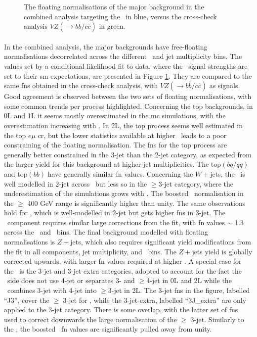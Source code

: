 \begin{figure}[h!]
    \caption{The floating normalisations of the major background in the combined analysis targeting the \vhbc\ in blue, versus the cross-check analysis $VZ(\rightarrow b\bar{b}/c\bar{c})$ in green.}
    \label{fig:FNback}
\end{figure} 

\paragraph{}In the combined analysis, the major backgrounds have free-floating normalisations decorrelated across the different \ptv\ and jet multiplicity bins. The values set by a conditional likelihood fit to data, where the \vhbc\ signal strengths are set to their \gls{sm} expectations, are presented in Figure \ref{fig:FNback}. They are compared to the same \glspl{fn} obtained in the cross-check analysis, with $VZ(\rightarrow b\bar{b}/c\bar{c})$ as signals. Good agreement is observed between the two sets of floating normalisations, with some common trends per process highlighted. Concerning the top backgrounds, in 0L and 1L it seems mostly overestimated in the \gls{mc} simulations, with the overestimation increasing with \ptv. In 2L, the top process seems well estimated in the top $e\mu$ \gls{cr}, but the lower statistics available at higher \ptv\ leads to a poor constraining of the floating normalisation. The \glspl{fn} for the top process are generally better constrained in the 3-jet than the 2-jet category, as expected from the larger yield for this background at higher jet multiplicities. The top$(bq/qq)$ and top$(bb)$ have generally similar \gls{fn} values. Concerning the $W+$jets, the \whf\ is well modelled in 2-jet across \ptv\ but less so in the $\geq$3-jet category, where the underestimation of the simulations grows with \ptv. The boosted \whf\ normalisation in the $\geq$ 400 GeV range is significantly higher than unity. The same observations hold for \wlf, which is well-modelled in 2-jet but gets higher \glspl{fn} in 3-jet. The \wmf\ component requires similar large corrections from the fit, with \gls{fn} values $\sim$ 1.3 across the \nj\ and \ptv\ bins. The final background modelled with floating normalisations is $Z+$jets, which also requires significant yield modifications from the fit in all components, jet multiplicity, and \ptv\ bins. The $Z+$jets yield is globally corrected upwards, with larger \gls{fn} values required at higher \ptv. A special case for the \zhf\ is the 3-jet and 3-jet-extra categories, adopted to account for the fact the \vhc\ side does not use 4-jet or separates 3- and $\geq$4-jet in 0L and 2L while the \vhb\ combines 3-jet with 4-jet into $\geq$3-jet in 2L. The 3-jet \glspl{fn} in the figure, labelled ``J3'', cover the $\geq$ 3-jet for \vhb, while the 3-jet-extra, labelled ``3J\_extra'' are only applied to the 3-jet category. There is some overlap, with the latter set of \glspl{fn} used to correct downwards the large normalisation of the $\geq$ 3-jet. Similarly to the \whf, the boosted \zhf\ \gls{fn} values are significantly pulled away from unity.
  
